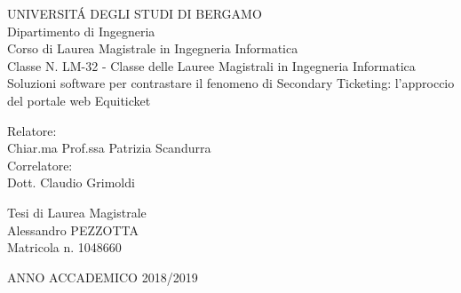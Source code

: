 \begin{titlepage}
	
\setlength{\parindent}{0pt}
\newcommand{\blank}[1]{\hspace*{#1}}

\begin{center}
	{\LARGE UNIVERSIT\'A DEGLI STUDI DI BERGAMO} \\
	\vspace{0.5cm}
	{Dipartimento di Ingegneria} \\
	\vspace{0.1cm}
	{Corso di Laurea Magistrale in Ingegneria Informatica} \\
	\vspace{0.1cm}
	{Classe N. LM-32 - Classe delle Lauree Magistrali in Ingegneria Informatica} \\
	\vspace{2cm}
	{\Huge Soluzioni software per contrastare il fenomeno di
Secondary Ticketing: l'approccio del portale web Equiticket} \\
	\vspace{2cm}
\end{center}

\begin{flushleft}
	{Relatore:} \\
	\vspace{0.1cm}
	{Chiar.ma Prof.ssa Patrizia Scandurra} \\
	\vspace{0.5cm}
	{Correlatore:} \\
	\vspace{0.1cm}
	{Dott. Claudio Grimoldi} \\
\end{flushleft}

\begin{flushright}
	\vspace{2cm}
	{Tesi di Laurea Magistrale} \\
	\vspace{0.1cm}
	{Alessandro PEZZOTTA \blank{0.2cm}} \\
	\vspace{0.1cm}
	{Matricola n. 1048660 \blank{0.6cm}} \\
\end{flushright}

\begin{center}
	\vspace{5cm}
	{\LARGE ANNO ACCADEMICO 2018/2019} \\
\end{center}


\end{titlepage}
